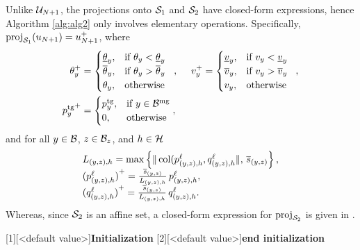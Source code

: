 %
Unlike $\mathcal U_{N+1}$, the projections onto $\mathcal S_1$ and $\mathcal S_2$ have closed-form expressions, hence Algorithm \ref{alg:alg2} only involves elementary operations. Specifically,
$	\mathrm{proj}_{\mathcal S_1}(u_{N+1})=
u_{N+1}^+$, where
\begin{align*}
	\theta_y^+ &=
	\begin{cases}
		\underline{\theta}_y, & \text{if } \theta_y < \underline{\theta}_y\\
		\overline{\theta}_y, & \text{if } \theta_y > \overline{\theta}_y\\
		\theta_y, & \text{otherwise } \
	\end{cases}, \quad \
	v_y^+ = 
	\begin{cases}
		\underline{v}_y, & \text{if } v_y < \underline{v}_y\\
		\overline{v}_y, & \text{if } v_y > \overline{v}_y\\
		v_y, & \text{otherwise } \
	\end{cases},
	\\
	{p_y^{\text{tg}}}^+ &= 
	\begin{cases}
		p_y^{\text{tg}}, & \text{if } y \in \mathcal B^{\text{mg}}\\
		0, & \text{otherwise} 
	\end{cases},
\end{align*}
and for all $y \in \mathcal B$, $z \in \mathcal B_z$, and  $h \in \mathcal H$
\begin{align*}
	\begin{array}{l}
		L_{(y,z),h} = \max \left\{ \|\operatorname{col}(p^\ell_{(y,z),h} , q^\ell_{(y,z),h} \|, \, \overline{s}_{(y,z)} \right\},\\[.2em]
		{(p^\ell_{(y,z),h})}^+  = \tfrac{\overline{s}_{(y,z)}}{
			L_{(y,z),h}
		}\,  p^\ell_{(y,z),h}, \\[.2em]
		{(q^\ell_{(y,z),h})}^+  = \tfrac{\overline{s}_{(y,z)}}{
			L_{(y,z),h}
		}\, q^\ell_{(y,z),h}.
	\end{array}
\end{align*}
Whereas, since $\mathcal S_2$ is an affine set, a closed-form expression for $\mathrm{proj}_{\mathcal S_2}$ is given in \cite[Example 29.17(ii)]{bauschke2011convex}.


[1][<default value>]{\textbf{Initialization}}
[2][<default value>]{\textbf{end initialization}}

